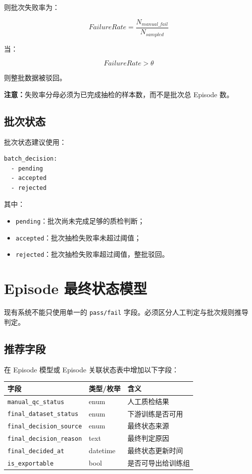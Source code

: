 \documentclass[UTF8,12pt,a4paper]{ctexart}
\begin{document}
则批次失败率为：

\[
FailureRate=\frac{N_{manual\_fail}}{N_{sampled}}
\]

当：

\[
FailureRate>\theta
\]

则整批数据被驳回。

\textbf{注意：}失败率分母必须为已完成抽检的样本数，而不是批次总 Episode 数。

\subsection{批次状态}

批次状态建议使用：

\begin{lstlisting}
batch_decision:
  - pending
  - accepted
  - rejected
\end{lstlisting}

其中：

\begin{itemize}
  \item \texttt{pending}：批次尚未完成足够的质检判断；
  \item \texttt{accepted}：批次抽检失败率未超过阈值；
  \item \texttt{rejected}：批次抽检失败率超过阈值，整批驳回。
\end{itemize}

\section{Episode 最终状态模型}

现有系统不能只使用单一的 \texttt{pass/fail} 字段。必须区分人工判定与批次规则推导判定。

\subsection{推荐字段}

在 Episode 模型或 Episode 关联状态表中增加以下字段：

\begin{longtable}{p{4.5cm}p{4cm}p{6cm}}
\toprule
字段 & 类型/枚举 & 含义 \\
\midrule
\texttt{manual\_qc\_status} & enum & 人工质检结果 \\
\texttt{final\_dataset\_status} & enum & 下游训练是否可用 \\
\texttt{final\_decision\_source} & enum & 最终状态来源 \\
\texttt{final\_decision\_reason} & text & 最终判定原因 \\
\texttt{final\_decided\_at} & datetime & 最终状态更新时间 \\
\texttt{is\_exportable} & bool & 是否可导出给训练组 \\
\bottomrule
\end{longtable}
\end{document}

